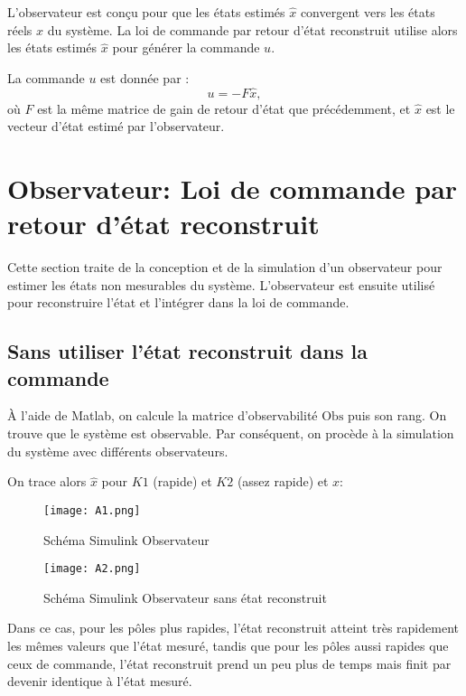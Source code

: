 \documentclass{report}
\begin{document}
L'observateur est conçu pour que les états estimés \( \hat{x} \) convergent vers les états réels \( x \) du système. La loi de commande par retour d'état reconstruit utilise alors les états estimés \( \hat{x} \) pour générer la commande \( u \).

La commande \( u \) est donnée par :
\[
u = -F \hat{x},
\]
où \( F \) est la même matrice de gain de retour d'état que précédemment, et \( \hat{x} \) est le vecteur d'état estimé par l'observateur.


\section{Observateur: Loi de commande par retour d'état reconstruit}

Cette section traite de la conception et de la simulation d'un observateur pour estimer les états non mesurables du système. L'observateur est ensuite utilisé pour reconstruire l'état et l'intégrer dans la loi de commande.

\subsection{Sans utiliser l'état reconstruit dans la commande}

À l'aide de Matlab, on calcule la matrice d'observabilité \( \text{Obs} \) puis son rang. On trouve que le système est observable. Par conséquent, on procède à la simulation du système avec différents observateurs.

On trace alors \( \hat{x} \) pour \( K1 \) (rapide) et \( K2 \) (assez rapide) et \( x \):

\begin{figure}[h!]
    \centering
    \texttt{[image: A1.png]} %
    \caption{Schéma Simulink Observateur}
    \label{fig:A1}
\end{figure}

\begin{figure}[h!]
    \centering
    \texttt{[image: A2.png]} %
    \caption{Schéma Simulink Observateur sans état reconstruit}
    \label{fig:A2}
\end{figure}

Dans ce cas, pour les pôles plus rapides, l'état reconstruit atteint très rapidement les mêmes valeurs que l'état mesuré, tandis que pour les pôles aussi rapides que ceux de commande, l'état reconstruit prend un peu plus de temps mais finit par devenir identique à l'état mesuré.
\end{document}
